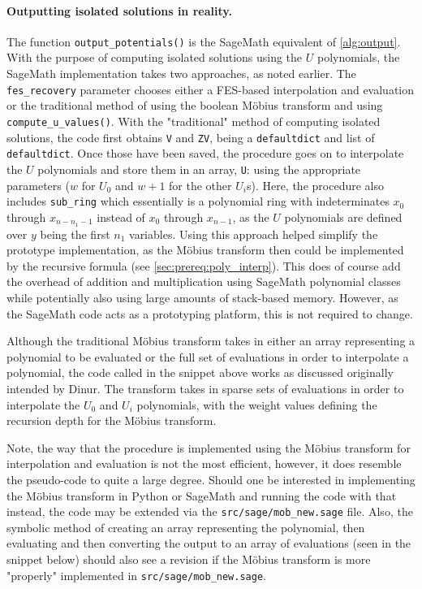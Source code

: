 \paragraph{Outputting isolated solutions in reality.} The function \texttt{output\_potentials()} is the SageMath equivalent of \cref{alg:output}. With the purpose of computing isolated solutions using the $U$ polynomials, the SageMath implementation takes two approaches, as noted earlier. The \texttt{fes\_recovery} parameter chooses either a FES-based interpolation and evaluation or the traditional method of using the boolean Möbius transform and using \texttt{compute\_u\_values()}. With the "traditional" method of computing isolated solutions, the code first obtains \texttt{V} and \texttt{ZV}, being a \texttt{defaultdict} and list of \texttt{defaultdict}. Once those have been saved, the procedure goes on to interpolate the $U$ polynomials and store them in an array, \texttt{U}:
using the appropriate parameters ($w$ for $U_0$ and $w + 1$ for the other $U_i$s). Here, the procedure also includes \texttt{sub\_ring} which essentially is a polynomial ring with indeterminates $x_0$ through $x_{n - n_1 - 1}$ instead of $x_0$ through $x_{n - 1}$, as the $U$ polynomials are defined over $y$ being the first $n_1$ variables. Using this approach helped simplify the prototype implementation, as the Möbius transform then could be implemented by the recursive formula (see \cref{sec:prereq:poly_interp}). This does of course add the overhead of addition and multiplication using SageMath polynomial classes while potentially also using large amounts of stack-based memory. However, as the SageMath code acts as a prototyping platform, this is not required to change.

Although the traditional Möbius transform takes in either an array representing a polynomial to be evaluated or the full set of evaluations in order to interpolate a polynomial, the code called in the snippet above works as discussed originally intended by Dinur. The transform takes in sparse sets of evaluations in order to interpolate the $U_0$ and $U_i$ polynomials, with the weight values defining the recursion depth for the Möbius transform. 

Note, the way that the procedure is implemented using the Möbius transform for interpolation and evaluation is not the most efficient, however, it does resemble the pseudo-code to quite a large degree. Should one be interested in implementing the Möbius transform in Python or SageMath and running the code with that instead, the code may be extended via the \texttt{src/sage/mob\_new.sage} file. Also, the symbolic method of creating an array representing the polynomial, then evaluating and then converting the output to an array of evaluations (seen in the snippet below)
should also see a revision if the Möbius transform is more "properly" implemented in \texttt{src/sage/mob\_new.sage}.

